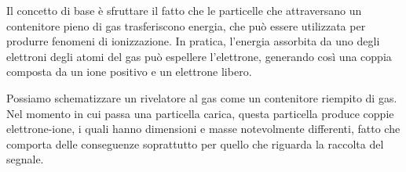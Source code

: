 Il concetto di base è sfruttare il fatto che le particelle che attraversano un contenitore pieno di gas trasferiscono energia, che può essere utilizzata per produrre fenomeni di ionizzazione. In pratica, l'energia assorbita da uno degli elettroni degli atomi del gas può espellere l'elettrone, generando così una coppia composta da un ione positivo e un elettrone libero.

\begin{minipage}{0.395\textwidth}
   \begin{figure}[H]
      \centering
   \end{figure}
\end{minipage}
\begin{minipage}{0.6\textwidth}
   \vspace{0.5cm}Possiamo schematizzare un rivelatore al gas come un contenitore riempito di gas. Nel momento in cui passa una particella carica, questa particella produce coppie elettrone-ione, i quali hanno dimensioni e masse notevolmente differenti, fatto che comporta delle conseguenze soprattutto per quello che riguarda la raccolta del segnale. 
\end{minipage}

